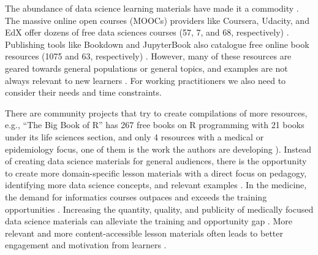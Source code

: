 \documentclass[020-persona\_validation.tex]{subfiles}
\begin{document}
    The abundance of data science learning materials have made it a commodity
    \cite{krossDemocratizationDataScience2020}.
    The massive online open courses (MOOCs) providers like
    Coursera,
    Udacity, and
    EdX
    offer dozens of free data sciences courses
    (57, 7, and 68, respectively)
    \cite{courseraTopFreeCourses, udacityDataScienceOnline, edxDataAnalysisCourses}.
    Publishing tools like Bookdown and
    JupyterBook
    also catalogue free online book resources
    (1075 and 63, respectively)
    \cite{bookdownAllBooksBookdown, executablebookprojectGalleryJupyterBooks}.
    However, many of these resources are geared towards general populations or general topics,
    and examples are not always relevant to new learners
    \cite{krossDemocratizationDataScience2020}.
    For working practitioners we also need to consider their needs and time constraints.

    There are community projects that try to create compilations of more resources,
    e.g., ``The Big Book of R'' has 267 free books on R programming with
    21 books under its life sciences section, and
    only 4 resources with a medical or epidemiology focus,
    one of them is the work the authors are developing \cite{baruffaBigBook2021}).
    Instead of creating data science materials for general audiences,
    there is the opportunity to create more domain-specific lesson materials
    with a direct focus on pedagogy,
    identifying more data science concepts,
    and relevant examples
    \cite{krossDemocratizationDataScience2020}.
    In the medicine, the demand for informatics courses outpaces and exceeds the training opportunities
    \cite{banerjeeMedicalStudentAwareness2015, americanmedicalassociationStudentInterestInformatics, americanmedicalassociationAcceleratingChangeMedical2021, americanmedicalassociationEducation}.
    Increasing the quantity, quality, and publicity of medically focused
    data science materials can alleviate the training and opportunity gap
    \cite{banerjeeMedicalStudentAwareness2015, americanmedicalassociationAcceleratingChangeMedical2021}.
    More relevant and more content-accessible lesson materials often leads to better engagement and motivation from learners
    \cite{wilson2019teaching, ambrose2010learning, Koch2016}.
    

\end{document}
